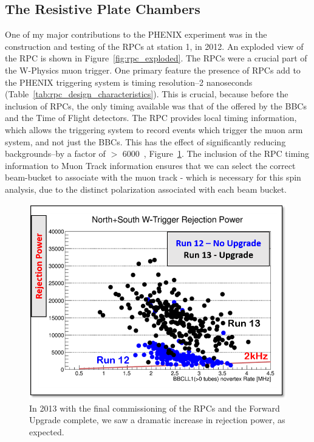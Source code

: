 \clearpage
\subsection{The Resistive Plate Chambers}

One of my major contributions to the PHENIX experiment was in the construction
and testing of the RPCs at station 1, in 2012. An exploded view of the RPC is
shown in Figure~\ref{fig:rpc_exploded}. The RPCs were a crucial part of the
W-Physics muon trigger. One primary feature the presence of RPCs add to the
PHENIX triggering system is timing resolution--2 nanoseconds
(Table~\ref{tab:rpc_design_characteristics}). This is crucial, because before
the inclusion of RPCs, the only timing available was that of the offered by the
BBCs and the Time of Flight detectors. The RPC provides local timing
information, which allows the triggering system to record events which trigger
the muon arm system, and not just the BBCs. This has the effect of significantly
reducing backgrounds--by a factor of $>$ 6000~\cite{Fukao2011},
Figure~\ref{fig:rpc_rejection_power}. The inclusion of the RPC timing
information to Muon Track information ensures that we can select the correct
beam-bucket to associate with the muon track - which is necessary for this spin
analysis, due to the distinct polarization associated with each beam bucket.

\begin{figure}
  \centering
  \includegraphics[width=0.8\linewidth]{./figures/rejection_power.png}
  \caption{
    In 2013 with the final commissioning of the RPCs and the Forward Upgrade
    complete, we saw a dramatic increase in rejection power, as expected.
  }
  \label{fig:rpc_rejection_power}

\end{figure}


